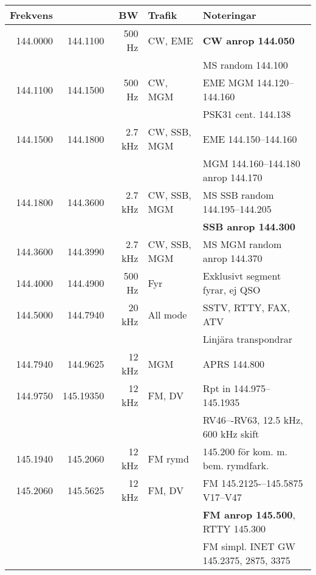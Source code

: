 \begin{landscape}
\begin{tabular}{rrrll}
\textbf{Frekvens} &  & \textbf{BW} & \textbf{Trafik} & \textbf{Noteringar} \\ \hline

144.0000 & 144.1100  & 500 Hz  & CW, EME      & \textbf{CW anrop 144.050}               \\
         &           &         &              & MS random 144.100                       \\ \hline
144.1100 & 144.1500  & 500 Hz  & CW, MGM      & EME MGM 144.120--144.160                \\
         &           &         &              & PSK31 cent. 144.138                     \\ \hline
144.1500 & 144.1800  & 2.7 kHz & CW, SSB, MGM & EME 144.150--144.160                    \\
         &           &         &              & MGM 144.160--144.180 anrop 144.170      \\ \hline
144.1800 & 144.3600  & 2.7 kHz & CW, SSB, MGM & MS SSB random 144.195--144.205          \\
         &           &         &              & \textbf{SSB anrop 144.300}              \\ \hline
144.3600 & 144.3990  & 2.7 kHz & CW, SSB, MGM & MS MGM random anrop 144.370             \\ \hline
144.4000 & 144.4900  & 500 Hz  & Fyr          & Exklusivt segment fyrar, ej QSO         \\ \hline
144.5000 & 144.7940  & 20 kHz  & All mode     & SSTV, RTTY, FAX, ATV                    \\
         &           &         &              & Linjära transpondrar                    \\ \hline
144.7940 & 144.9625  & 12 kHz  & MGM          & APRS 144.800                            \\ \hline
144.9750 & 145.19350 & 12 kHz  & FM, DV       & Rpt in 144.975--145.1935                \\
         &           &         &              & RV46–-RV63, 12.5 kHz, 600 kHz skift     \\ \hline
145.1940 & 145.2060  & 12 kHz  & FM rymd      & 145.200 för kom. m. bem. rymdfark.      \\ \hline
145.2060 & 145.5625  & 12 kHz  & FM, DV       & FM 145.2125-–145.5875  V17–V47          \\
         &           &         &              & \textbf{FM anrop 145.500}, RTTY 145.300 \\
         &           &         &              & FM simpl. INET GW 145.2375, 2875, 3375  \\

\end{tabular}
\end{landscape}
